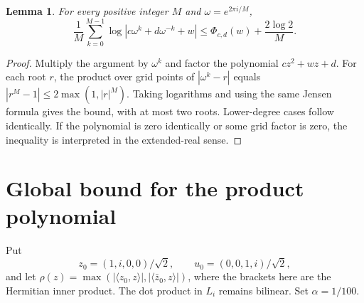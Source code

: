 \documentclass[11pt]{article}
\newtheorem{lemma}{Lemma}
\begin{document}
\begin{lemma}\label{grid}
For every positive integer $M$ and $\omega=e^{2\pi i/M}$,
\[
 \frac1M\sum_{k=0}^{M-1}\log|c\omega^k+d\omega^{-k}+w|\le\Phi_{c,d}(w)+\frac{2\log2}{M}.
\]
\end{lemma}
\begin{proof}
Multiply the argument by $\omega^k$ and factor the polynomial $cz^2+wz+d$. For each root $r$, the product over grid points of $|\omega^k-r|$ equals $|r^M-1|\le2\max(1,|r|^M)$. Taking logarithms and using the same Jensen formula gives the bound, with at most two roots. Lower-degree cases follow identically. If the polynomial is zero identically or some grid factor is zero, the inequality is interpreted in the extended-real sense.
\end{proof}

\section{Global bound for the product polynomial}
Put
\[
 z_0=(1,i,0,0)/\sqrt2,\qquad u_0=(0,0,1,i)/\sqrt2,
\]
and let $\rho(z)=\max(|\langle z_0,z\rangle|,|\langle\bar z_0,z\rangle|)$, where the brackets here are the Hermitian inner product. The dot product in $L_i$ remains bilinear. Set $\alpha=1/100$.
\end{document}
